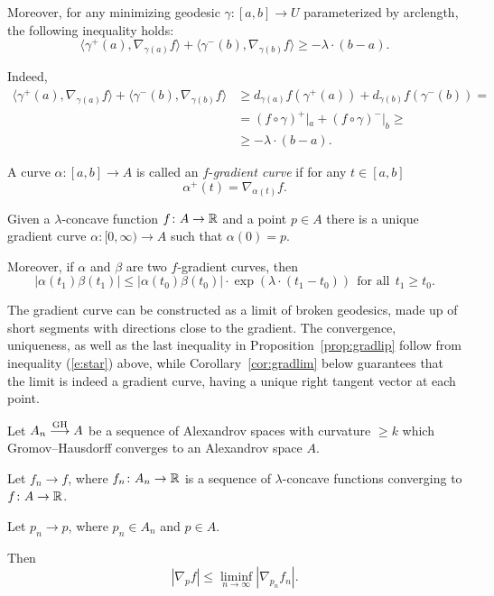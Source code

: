 \documentclass{amsart}
\begin{document}
Moreover, for any minimizing geodesic $\gamma\colon  [a,b]\to U$
parameterized by arclength, the following inequality holds:
\begin{equation}\label{e:star}
\langle \gamma^+(a),\nabla_{\gamma(a)} f\rangle +\langle\gamma^-(b),\nabla_{\gamma(b)} f\rangle
\ge -\lambda\cdot (b-a) .
\end{equation}

Indeed,
\begin{align*}
\langle   \gamma^+(a),  \nabla_{\gamma(a)}  f   \rangle +
\langle  \gamma^-(b),   \nabla_{\gamma(b)} f  \rangle
&\ge
d_{\gamma(a)}f(\gamma^+(a))+d_{\gamma(b)}f(\gamma^-(b))
=
\\
&=
(f\circ\gamma)^+|_a+(f\circ\gamma)^-|_b\ge
\\
&\ge -\lambda\cdot (b-a).
\end{align*}

\begin{defn}A curve $\alpha\colon [a,b] \rightarrow A$ is called an $f$-\emph{gradient curve} if for any $t\in [a,b]$
$$\alpha^+(t)=\nabla_{\alpha(t)}f.$$
\end{defn}

\begin{prop}\label{prop:gradlip} Given a $\lambda$-concave function $f\colon A \rightarrow {\Bbb R}$ and a point $p\in A$ there is a unique gradient curve $\alpha\colon [0,\infty) \rightarrow A$ such that $\alpha(0)=p$.

Moreover, if $\alpha$ and $\beta$ are two $f$-gradient curves, then
$$|\alpha(t_1)\beta(t_1)|\le |\alpha(t_0)\beta(t_0)|\cdot \exp(\lambda\cdot  (t_1-t_0))
\ \ \text{for all}\ \ t_1\ge t_0.$$

\end{prop}

The gradient curve  can be constructed as a limit of broken geodesics,
made up of short segments with directions close to the gradient.
The convergence, uniqueness, as well as the last inequality
in Proposition~\ref{prop:gradlip}
follow from
inequality (\ref{e:star}) above, while Corollary~\ref{cor:gradlim}
below guarantees that the limit is indeed
a gradient curve, having a unique right tangent vector at each point.

\begin{lem}\label{lem:gradcon}
 Let $A_n \GHto A$ be a sequence of
Alexandrov spaces with curvature $\ge k$
which Gromov--Hausdorff converges to an Alexandrov space $A$.

Let $f_n\to f$, where $f_n\colon A_n\to {\Bbb R}$ is a sequence of $\lambda$-concave
functions converging to $f\colon A\to {\Bbb R}$.

Let $p_n\to p$,  where $p_n\in A_n$ and $p\in A$.

Then
$$|\nabla_p f|\le \liminf_{n\to \infty} |\nabla_{p_n} f_n|.$$
\end{lem}
\end{document}

